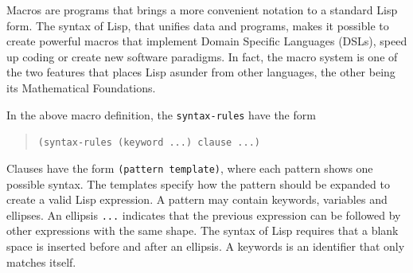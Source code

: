\documentclass[a4paper,12pt]{book}
\begin{document}
Macros are programs that brings a more convenient
notation to a standard Lisp form. The syntax of Lisp,
that unifies data and programs, makes it possible to
create powerful macros that implement Domain Specific
Languages (DSLs), speed up coding or create new software
paradigms. In fact, the macro system is one of the
two features that places Lisp asunder from other
languages, the other being its Mathematical Foundations.

In the above macro definition, the \verb|syntax-rules|
have the form
\begin{quote}
\verb|(syntax-rules (keyword ...) clause ...)|
\end{quote}
Clauses have the form \verb|(pattern template)|,
where each pattern shows one possible syntax.
The templates specify how the pattern should
be expanded to create a valid Lisp expression.
A pattern may contain keywords, variables and
ellipses. An ellipsis \verb|...| indicates that
the previous expression can be followed by other
expressions with the same shape. The syntax of
Lisp requires that a blank space is inserted before
and after an ellipsis. A keywords is
an identifier that only matches itself.
\end{document}

